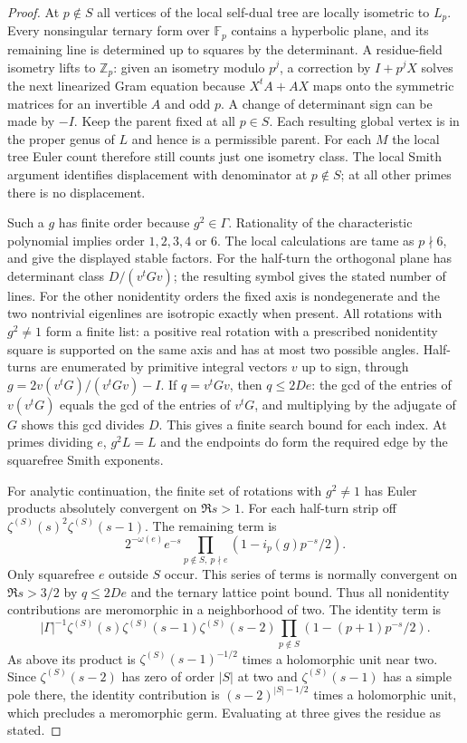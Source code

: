 \begin{proof}
At $p\notin S$ all vertices of the local self-dual tree are locally
isometric to $L_p$. Every nonsingular
ternary form over $\mathbb F_p$ contains a hyperbolic plane, and its
remaining line is determined up to squares by the determinant. A
residue-field isometry lifts to $\mathbb Z_p$: given an isometry
modulo $p^j$, a correction by $I+p^jX$ solves the next linearized
Gram equation because $X^tA+AX$ maps onto the symmetric matrices
for an invertible $A$ and odd $p$. A change of determinant sign can
be made by $-I$. Keep the parent fixed at all $p\in S$. Each
resulting global vertex is in the proper genus of $L$ and hence
is a permissible parent. For each $M$ the local tree Euler count
therefore still counts just one isometry class. The local Smith
argument identifies displacement with denominator at $p\notin S$;
at all other primes there is no displacement.

Such a $g$ has finite order because $g^2\in\Gamma$. Rationality of
the characteristic polynomial implies order $1,2,3,4$ or $6$.
The local calculations are tame as $p\nmid6$, and give the displayed
stable factors. For the half-turn the orthogonal plane has determinant
class $D/(v^tGv)$; the resulting symbol gives the stated number of
lines. For the other nonidentity orders the fixed axis is nondegenerate
and the two nontrivial eigenlines are isotropic exactly when present.
All rotations with $g^2\ne1$ form a finite list: a positive real
rotation with a prescribed nonidentity square is supported on the
same axis and has at most two possible angles. Half-turns are enumerated
by primitive integral vectors $v$ up to sign, through
$g=2v(v^tG)/(v^tGv)-I$. If $q=v^tGv$, then
$q\le 2De$: the gcd of the entries of $v(v^tG)$ equals the gcd
of the entries of $v^tG$, and multiplying by the adjugate of $G$
shows this gcd divides $D$. This gives a finite search bound for each
index. At primes dividing $e$, $g^2L=L$ and the endpoints do form
the required edge by the squarefree Smith exponents.

For analytic continuation, the finite set of rotations with $g^2\ne1$
has Euler products absolutely convergent on $\Re s>1$. For each
half-turn strip off $\zeta^{(S)}(s)^2\zeta^{(S)}(s-1)$. The remaining
term is
\[
 2^{-\omega(e)}e^{-s}
 \prod_{p\notin S,\ p\nmid e}(1-i_p(g)p^{-s}/2).
\]
Only squarefree $e$ outside $S$ occur. This series of terms is
normally convergent on $\Re s>3/2$ by $q\le2De$ and the ternary
lattice point bound. Thus all nonidentity contributions are meromorphic
in a neighborhood of two. The identity term is
\[
 |\Gamma|^{-1}\zeta^{(S)}(s)\zeta^{(S)}(s-1)\zeta^{(S)}(s-2)
       \prod_{p\notin S}(1-(p+1)p^{-s}/2).
\]
As above its product is $\zeta^{(S)}(s-1)^{-1/2}$ times a holomorphic
unit near two. Since $\zeta^{(S)}(s-2)$ has zero of order $|S|$ at
two and $\zeta^{(S)}(s-1)$ has a simple pole there, the identity
contribution is $(s-2)^{|S|-1/2}$ times a holomorphic unit, which
precludes a meromorphic germ. Evaluating at three gives the residue
as stated.
\end{proof}
